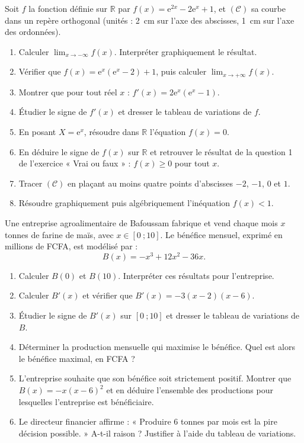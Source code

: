 \documentclass[11pt]{article}
\begin{document}
\begin{exercice}
Soit $f$ la fonction définie sur $\mathbb{R}$ par $f(x) = \mathrm{e}^{2x} - 2\mathrm{e}^x + 1$, et $(\mathcal{C})$ sa courbe dans un repère orthogonal (unités : \SI{2}{cm} sur l'axe des abscisses, \SI{1}{cm} sur l'axe des ordonnées).
\begin{enumerate}
\item Calculer $\displaystyle\lim_{x \to -\infty} f(x)$. Interpréter graphiquement le résultat.
\item Vérifier que $f(x) = \mathrm{e}^x\left(\mathrm{e}^x - 2\right) + 1$, puis calculer $\displaystyle\lim_{x \to +\infty} f(x)$.
\item Montrer que pour tout réel $x$ : $f'(x) = 2\mathrm{e}^x\left(\mathrm{e}^x - 1\right)$.
\item Étudier le signe de $f'(x)$ et dresser le tableau de variations de $f$.
\item En posant $X = \mathrm{e}^x$, résoudre dans $\mathbb{R}$ l'équation $f(x) = 0$.
\item En déduire le signe de $f(x)$ sur $\mathbb{R}$ et retrouver le résultat de la question 1 de l'exercice « Vrai ou faux » : $f(x) \geq 0$ pour tout $x$.
\item Tracer $(\mathcal{C})$ en plaçant au moins quatre points d'abscisses $-2$, $-1$, $0$ et $1$.
\item Résoudre graphiquement puis algébriquement l'inéquation $f(x) < 1$.
\end{enumerate}
\end{exercice}

\begin{exercice}
Une entreprise agroalimentaire de Bafoussam fabrique et vend chaque mois $x$ tonnes de farine de maïs, avec $x \in [0\ ; 10]$. Le bénéfice mensuel, exprimé en millions de FCFA, est modélisé par :
\[ B(x) = -x^3 + 12x^2 - 36x. \]
\begin{enumerate}
\item Calculer $B(0)$ et $B(10)$. Interpréter ces résultats pour l'entreprise.
\item Calculer $B'(x)$ et vérifier que $B'(x) = -3(x - 2)(x - 6)$.
\item Étudier le signe de $B'(x)$ sur $[0\ ; 10]$ et dresser le tableau de variations de $B$.
\item Déterminer la production mensuelle qui maximise le bénéfice. Quel est alors le bénéfice maximal, en FCFA ?
\item L'entreprise souhaite que son bénéfice soit strictement positif. Montrer que $B(x) = -x(x - 6)^2$ et en déduire l'ensemble des productions pour lesquelles l'entreprise est bénéficiaire.
\item Le directeur financier affirme : « Produire 6 tonnes par mois est la pire décision possible. » A-t-il raison ? Justifier à l'aide du tableau de variations.
\end{enumerate}
\end{exercice}
\end{document}
